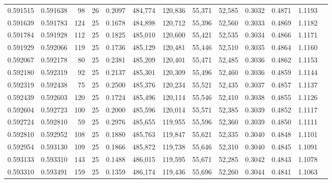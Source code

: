 \begin{tabular}{rrrrrrrrrrrrr}
0.591515 & 0.591638 &    98 &  26 &                                     0.2097 & 484,774 & 120,836 &  55,371 &  52,585 & 0.3032 & 0.4871 & 1.1193 \\
0.591639 & 0.591783 &   124 &  25 &                                     0.1678 & 484,898 & 120,712 &  55,396 &  52,560 & 0.3033 & 0.4869 & 1.1182 \\
0.591784 & 0.591928 &   112 &  25 &                                     0.1825 & 485,010 & 120,600 &  55,421 &  52,535 & 0.3034 & 0.4866 & 1.1171 \\
0.591929 & 0.592066 &   119 &  25 &                                     0.1736 & 485,129 & 120,481 &  55,446 &  52,510 & 0.3035 & 0.4864 & 1.1160 \\
0.592067 & 0.592178 &    80 &  25 &                                     0.2381 & 485,209 & 120,401 &  55,471 &  52,485 & 0.3036 & 0.4862 & 1.1153 \\
0.592180 & 0.592319 &    92 &  25 &                                     0.2137 & 485,301 & 120,309 &  55,496 &  52,460 & 0.3036 & 0.4859 & 1.1144 \\
0.592319 & 0.592438 &    75 &  25 &                                     0.2500 & 485,376 & 120,234 &  55,521 &  52,435 & 0.3037 & 0.4857 & 1.1137 \\
0.592439 & 0.592603 &   120 &  25 &                                     0.1724 & 485,496 & 120,114 &  55,546 &  52,410 & 0.3038 & 0.4855 & 1.1126 \\
0.592604 & 0.592723 &   100 &  25 &                                     0.2000 & 485,596 & 120,014 &  55,571 &  52,385 & 0.3039 & 0.4852 & 1.1117 \\
0.592724 & 0.592810 &    59 &  25 &                                     0.2976 & 485,655 & 119,955 &  55,596 &  52,360 & 0.3039 & 0.4850 & 1.1111 \\
0.592810 & 0.592952 &   108 &  25 &                                     0.1880 & 485,763 & 119,847 &  55,621 &  52,335 & 0.3040 & 0.4848 & 1.1101 \\
0.592954 & 0.593130 &   109 &  25 &                                     0.1866 & 485,872 & 119,738 &  55,646 &  52,310 & 0.3040 & 0.4845 & 1.1091 \\
0.593133 & 0.593310 &   143 &  25 &                                     0.1488 & 486,015 & 119,595 &  55,671 &  52,285 & 0.3042 & 0.4843 & 1.1078 \\
0.593310 & 0.593491 &   159 &  25 &                                     0.1359 & 486,174 & 119,436 &  55,696 &  52,260 & 0.3044 & 0.4841 & 1.1063 \\

\end{tabular}

